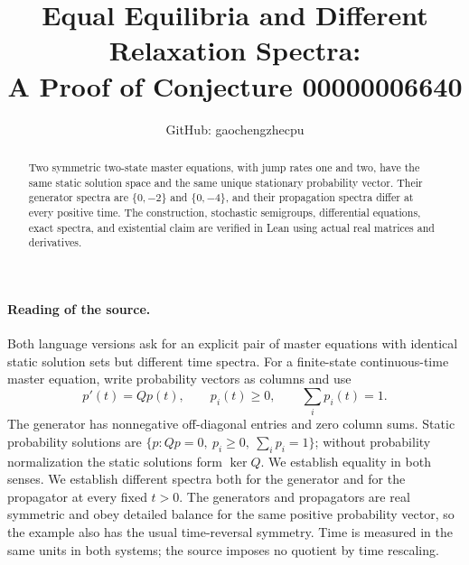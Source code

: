 \documentclass[11pt]{article}
\title{Equal Equilibria and Different Relaxation Spectra:\\
A Proof of Conjecture 00000006640}
\author{GitHub: gaochengzhecpu}
\date{}
\begin{document}
\maketitle
\begin{abstract}
Two symmetric two-state master equations, with jump rates one and two,
have the same static solution space and the same unique stationary
probability vector. Their generator spectra are $\{0,-2\}$ and
$\{0,-4\}$, and their propagation spectra differ at every positive time.
The construction, stochastic semigroups, differential equations, exact
spectra, and existential claim are verified in Lean using actual real
matrices and derivatives.
\end{abstract}

\paragraph{Reading of the source.}
Both language versions ask for an explicit pair of master equations
with identical static solution sets but different time spectra.
For a finite-state continuous-time master equation, write probability
vectors as columns and use
\[
 p'(t)=Qp(t),\qquad p_i(t)\geq0,\qquad \sum_i p_i(t)=1.
\]
The generator has nonnegative off-diagonal entries and zero column sums.
Static probability solutions are $\{p:Qp=0,\ p_i\geq0,\ \sum_i p_i=1\}$;
without probability normalization the static solutions form $\ker Q$.
We establish equality in both senses. We establish different spectra
both for the generator and for the propagator at every fixed $t>0$.
The generators and propagators are real symmetric and obey detailed
balance for the same positive probability vector, so the example also
has the usual time-reversal symmetry. Time is measured in the same
units in both systems; the source imposes no quotient by time rescaling.
\end{document}
